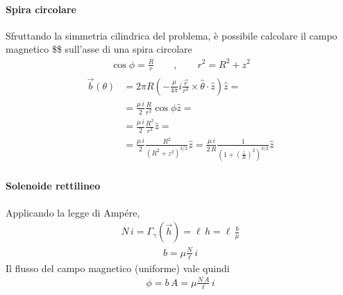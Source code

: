 \documentclass[letterpaper,10pt,italian]{jupyterBook}
\begin{document}
\paragraph{Spira circolare}
\label{\detokenize{ch/electromagnetism/electromagnetism-steady:spira-circolare}}
\sphinxAtStartPar
Sfruttando la simmetria cilindrica del problema, è possibile calcolare il campo magnetico \$\$ sull’asse di una spira circolare
\begin{equation*}
\begin{split}\cos \phi = \frac{R}{r} \qquad , \qquad
r^2 = R^2 + z^2\end{split}
\end{equation*}\begin{equation*}
\begin{split}\begin{aligned}
  \vec{b}(\theta) & = 2 \pi R \left( -\frac{\mu}{4 \pi} i \frac{\vec{r}}{r^3} \times \hat{\theta} \cdot \hat{z} \right) \hat{z} = \\
   & = \frac{\mu \, i}{2} \frac{R}{r^2} \cos \phi \hat{z} = \\
   & = \frac{\mu \, i}{2} \frac{R^2}{r^3} \hat{z}  = \\
   & = \frac{\mu \, i}{2} \frac{R^2}{(R^2 + z^2)^{3/2}} \hat{z}  =
       \frac{\mu \, i}{2 \, R} \frac{1}{\left(1 + \left(\frac{z}{R}\right)^2 \right)^{3/2}} \hat{z} 
\end{aligned}\end{split}
\end{equation*}

\paragraph{Solenoide rettilineo}
\label{\detokenize{ch/electromagnetism/electromagnetism-steady:solenoide-rettilineo}}
\sphinxAtStartPar
Applicando la legge di Ampére,
\begin{equation*}
\begin{split} N \, i = \Gamma_{\gamma}(\vec{h}) = \ell \, h = \ell \, \frac{b}{\mu}\end{split}
\end{equation*}\begin{equation*}
\begin{split}b = \mu \frac{N}{\ell} \, i\end{split}
\end{equation*}
\sphinxAtStartPar
Il flusso del campo magnetico (uniforme) vale quindi
\begin{equation*}
\begin{split}\phi = b \, A = \mu \frac{N \, A}{\ell} \, i\end{split}
\end{equation*}
\end{document}
